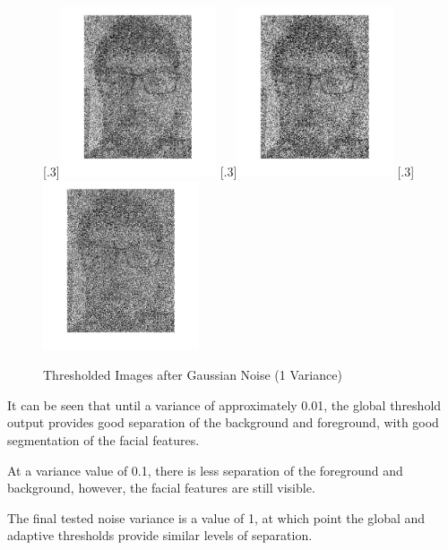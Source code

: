 \documentclass[a4paper]{article}
\begin{document}
	\begin{figure}[H]
		\centering
		[.3\linewidth]{\includegraphics[height=5cm]{Results/Q1/d/qdVar1.jpg}}%
		[.3\linewidth]{\includegraphics[height=5cm]{Results/Q1/d/qdThresh1.jpg}}%
		[.3\linewidth]{\includegraphics[height=5cm]{Results/Q1/d/qd5x51.jpg}}%
		\caption{Thresholded Images after Gaussian Noise (1 Variance)}
		\label{fig:}
	\end{figure}
	\par It can be seen that until a variance of approximately 0.01, the
	global threshold output provides good separation of the background and
	foreground, with good segmentation of the facial features.
	\par At a variance value of 0.1, there is less separation of the
	foreground and background, however, the facial features are still
	visible.
	\par The final tested noise variance is a value of 1, at which point the
	global and adaptive thresholds provide similar levels of separation.
\end{document}
